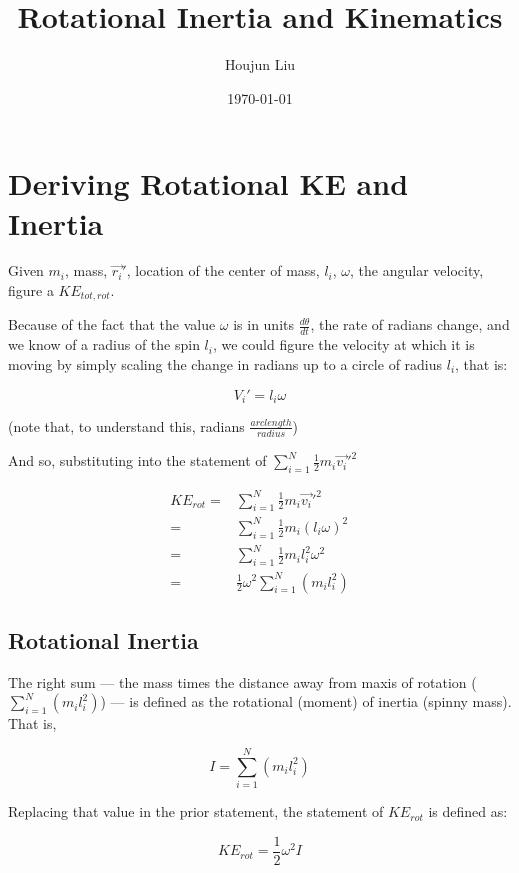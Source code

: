 \documentclass[letterpaper]{article}
\author{Houjun Liu}
\date{\today}
\title{Rotational Inertia and Kinematics}
\renewcommand{\tableofcontents}{}
\begin{document}
\tableofcontents


\section{Deriving Rotational KE and Inertia}
\label{sec:org55d5ea4}
Given \(m_i\), mass, \(\vec{r_i}'\), location of the center of mass, \(l_i\), \(\omega\), the angular velocity, figure a \(KE_{tot,rot}\). 

Because of the fact that the value \(\omega\) is in units \(\frac{d\theta}{dt}\), the rate of radians change, and we know of a radius of the spin \(l_i\), we could figure the velocity at which it is moving by simply scaling the change in radians up to a circle of radius \(l_i\), that is:

\begin{equation}
    V_i' = l_i \omega 
\end{equation}

(note that, to understand this, radians \(\frac{arc length}{radius}\))

And so, substituting into the statement of \(\sum^N_{i=1} \frac{1}{2}m_i\vec{v_i}'^2\)

\begin{align}
    KE_{rot} =& \sum^N_{i=1} \frac{1}{2}m_i\vec{v_i}'^2 \\
    =& \sum^N_{i=1} \frac{1}{2}m_i(l_i \omega)^2 \\
    =& \sum^N_{i=1} \frac{1}{2}m_i l_i^2 \omega^2 \\
    =& \frac{1}{2}\omega^2 \sum^N_{i=1} (m_i l_i^2)
\end{align}

\subsection{Rotational Inertia}
\label{sec:org469b696}
The right sum --- the mass times the distance away from maxis of rotation (\(\sum^N_{i=1} (m_i l_i^2)\)) --- is defined as the rotational (moment) of inertia (spinny mass). That is,

\begin{equation}
    I = \sum^N_{i=1} (m_i l_i^2)
\end{equation}

Replacing that value in the prior statement, the statement of \(KE_{rot}\) is defined as:

\begin{equation}
    KE_{rot} = \frac{1}{2}\omega^2I
\end{equation}
\end{document}
